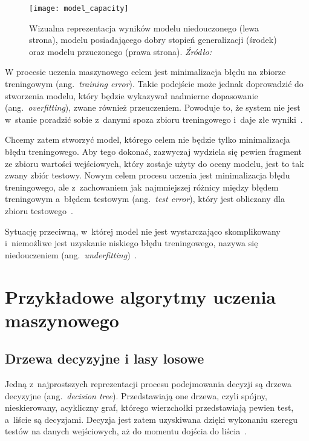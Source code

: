 \begin{figure}[h]
    \centering
    \texttt{[image: model\_capacity]}
    \caption{Wizualna reprezentacja wyników modelu niedouczonego (lewa strona), modelu posiadającego dobry stopień generalizacji (środek) oraz modelu przuczonego (prawa strona). \textit{Źródło:~\cite{Goodfellow2016}}}
    \label{fig:model-capacity}
\end{figure}

W procesie uczenia maszynowego celem jest minimalizacja błędu na zbiorze treningowym (ang.~\textit{training error}).
Takie podejście może jednak doprowadzić do stworzenia modelu, który będzie wykazywał nadmierne dopasowanie (ang.~\textit{overfitting}), zwane również przeuczeniem.
Powoduje to, że system nie jest w~stanie poradzić sobie z~danymi spoza zbioru treningowego i~daje złe wyniki~\cite{Goodfellow2016}.

Chcemy zatem stworzyć model, którego celem nie będzie tylko minimalizacja błędu treningowego.
Aby tego dokonać, zazwyczaj wydziela się pewien fragment ze zbioru wartości wejściowych, który zostaje użyty do oceny modelu, jest to tak zwany zbiór testowy.
Nowym celem procesu uczenia jest minimalizacja błędu treningowego, ale z~zachowaniem jak najmniejszej różnicy między błędem treningowym a~błędem testowym (ang.~\textit{test error}), który jest obliczany dla zbioru testowego~\cite{Goodfellow2016}.

Sytuację przeciwną, w~której model nie jest wystarczająco skomplikowany i~niemożliwe jest uzyskanie niskiego błędu treningowego, nazywa się niedouczeniem (ang.~\textit{underfitting})~\cite{Goodfellow2016}.

\section{Przykładowe algorytmy uczenia maszynowego}\label{sec:przykadowe-algorytmy-uczenia-maszynowego}

\subsection{Drzewa decyzyjne i lasy losowe}\label{subsec:drzewa-decyzyjne-i-lasy-losowe}

Jedną z~najprostszych reprezentacji procesu podejmowania decyzji są drzewa decyzyjne (ang.~\textit{decision tree}).
Przedstawiają one drzewa, czyli spójny, nieskierowany, acykliczny graf, którego wierzchołki przedstawiają pewien test, a~liście są decyzjami.
Decyzja jest zatem uzyskiwana dzięki wykonaniu szeregu testów na danych wejściowych, aż do momentu dojścia do liścia~\cite{Russell2020}.

